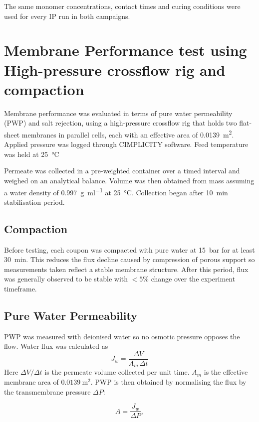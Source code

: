 The same monomer concentrations, contact times and curing conditions were used for every IP run in both campaigns.

\section{Membrane Performance test using High-pressure crossflow rig and compaction}
\label{sec:rig performance}
Membrane performance was evaluated in terms of pure water permeability (PWP) and salt rejection, using a high-pressure crossflow rig that holds two flat-sheet membranes in parallel cells, each with an effective area of \qty{0.0139}{\metre\squared}. Applied pressure was logged through CIMPLICITY software. Feed temperature was held at \qty{25}{\degreeCelsius}

Permeate was collected in a pre-weighted container over a timed interval and weighed on an analytical balance. Volume was then obtained from mass assuming a water density of \qty{0.997}{\gram\per\milli\litre} at \qty{25}{\degreeCelsius}. Collection began after \qty{10}{\minute} stabilisation period. 

\subsection{Compaction}
Before testing, each coupon was compacted with pure water at \qty{15}{bar} for at least \qty{30}{\minute}. This reduces the flux decline caused by compression of porous support so measurements taken reflect a stable membrane structure. After this period, flux was generally observed to be stable with $<5\%$ change over the experiment timeframe. 

\subsection{Pure Water Permeability}
PWP was measured with deionised water so no osmotic pressure opposes the flow. Water flux was calculated as
\begin{equation}
  J_w = \frac{\Delta V}{A_m\,\Delta t}
  \label{eq:water-flux-methods}
\end{equation}
Here $\Delta V/\Delta t$ is the permeate volume collected per unit time.  $A_m$ is the effective membrane area of $\SI{0.0139}{\square\metre}$. PWP is then obtained by normalising the flux by the transmembrane pressure $\Delta P$: 

\begin{equation}
  A = \frac{J_w}{\Delta P},
  \label{eq:pwp-methods}
\end{equation}

